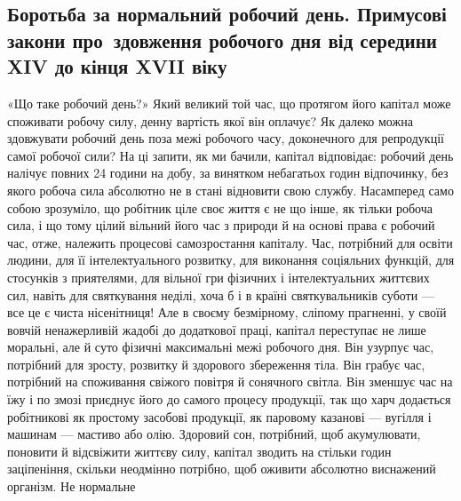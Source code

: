 \subsection{Боротьба за нормальний робочий день. Примусові закони про~здовження робочого дня від середини XIV до кінця XVII віку}

«Що таке робочий день?» Який великий той час, що протягом
його капітал може споживати робочу силу, денну вартість якої
він оплачує? Як далеко можна здовжувати робочий день поза
межі робочого часу, доконечного для репродукції самої робочої
сили? На ці запити, як ми бачили, капітал відповідає: робочий
день налічує повних 24 години на добу, за винятком небагатьох
годин відпочинку, без якого робоча сила абсолютно не в стані
відновити свою службу. Насамперед само собою зрозуміло, що
робітник ціле своє життя є не що інше, як тільки робоча сила,
і що тому цілий вільний його час з природи й на основі права є
робочий час, отже, належить процесові самозростання капіталу.
Час, потрібний для освіти людини, для її інтелектуального розвитку,
для виконання соціяльних функцій, для стосунків з приятелями,
для вільної гри фізичних і інтелектуальних життєвих
сил, навіть для святкування неділі, хоча б і в країні святкувальників
суботи — все це є чиста нісенітниця! Але в своєму безмірному,
сліпому прагненні, у своїй вовчій ненажерливій жадобі
до додаткової праці, капітал переступає не лише моральні,
але й суто фізичні максимальні межі робочого дня. Він узурпує
час, потрібний для зросту, розвитку й здорового збереження
тіла. Він грабує час, потрібний на споживання свіжого повітря
й сонячного світла. Він зменшує час на їжу і по змозі приєднує
його до самого процесу продукції, так що харч додається робітникові
як простому засобові продукції, як паровому казанові —
вугілля і машинам — мастиво або олію. Здоровий сон, потрібний,
щоб акумулювати, поновити й відсвіжити життєву силу, капітал
зводить на стільки годин заціпеніння, скільки неодмінно потрібно,
щоб оживити абсолютно виснажений організм. Не нормальне
\parbreak{}  %
